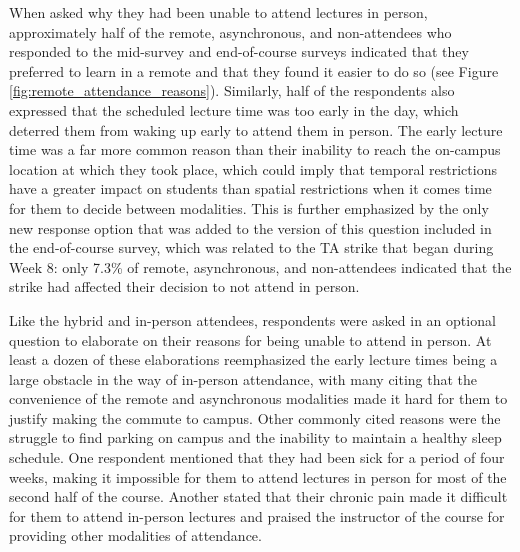When asked why they had been unable to attend lectures in person, approximately half of the remote, asynchronous, and non-attendees who responded to the mid-survey and end-of-course surveys indicated that they preferred to learn in a remote and that they found it easier to do so (see Figure \ref{fig:remote_attendance_reasons}). Similarly, half of the respondents also expressed that the scheduled lecture time was too early in the day, which deterred them from waking up early to attend them in person. The early lecture time was a far more common reason than their inability to reach the on-campus location at which they took place, which could imply that temporal restrictions have a greater impact on students than spatial restrictions when it comes time for them to decide between modalities. This is further emphasized by the only new response option that was added to the version of this question included in the end-of-course survey, which was related to the TA strike that began during Week 8: only 7.3\% of remote, asynchronous, and non-attendees indicated that the strike had affected their decision to not attend in person.

Like the hybrid and in-person attendees, respondents were asked in an optional question to elaborate on their reasons for being unable to attend in person. At least a dozen of these elaborations reemphasized the early lecture times being a large obstacle in the way of in-person attendance, with many citing that the convenience of the remote and asynchronous modalities made it hard for them to justify making the commute to campus. Other commonly cited reasons were the struggle to find parking on campus and the inability to maintain a healthy sleep schedule. One respondent mentioned that they had been sick for a period of four weeks, making it impossible for them to attend lectures in person for most of the second half of the course. Another stated that their chronic pain made it difficult for them to attend in-person lectures and praised the instructor of the course for providing other modalities of attendance.

